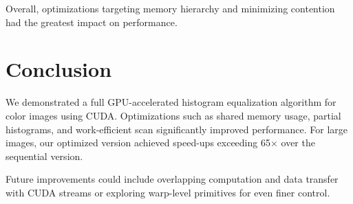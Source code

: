 \documentclass[9pt]{IEEEtran}
\begin{document}
Overall, optimizations targeting memory hierarchy and minimizing contention had the greatest impact on performance.

\section{Conclusion}
We demonstrated a full GPU-accelerated histogram equalization algorithm for color images using CUDA. Optimizations such as shared memory usage, partial histograms, and work-efficient scan significantly improved performance. For large images, our optimized version achieved speed-ups exceeding 65\(\times\) over the sequential version.

Future improvements could include overlapping computation and data transfer with CUDA streams or exploring warp-level primitives for even finer control.



\end{document}
